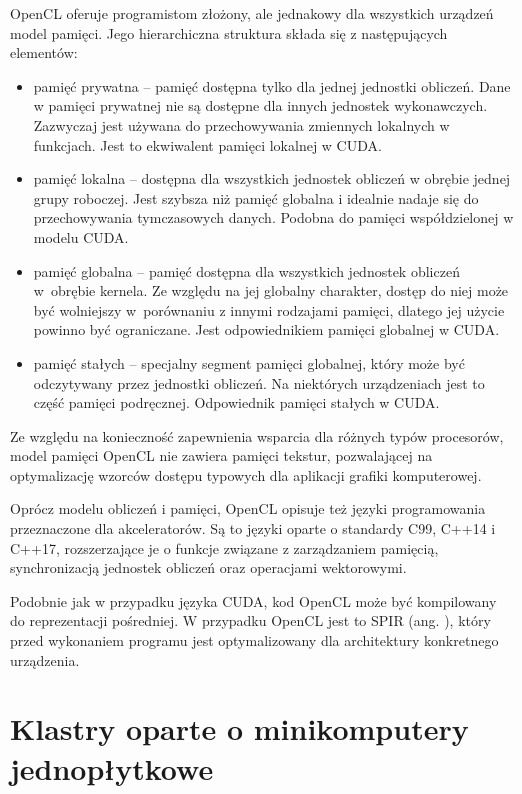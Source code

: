 OpenCL oferuje programistom złożony, ale jednakowy dla wszystkich urządzeń model pamięci. Jego hierarchiczna
struktura składa się z następujących elementów:
\begin{itemize}
      \item pamięć prywatna -- pamięć dostępna tylko dla jednej jednostki obliczeń. Dane w pamięci prywatnej nie
            są dostępne dla innych jednostek wykonawczych. Zazwyczaj jest używana do przechowywania zmiennych
            lokalnych w funkcjach. Jest to ekwiwalent pamięci lokalnej w CUDA.
      \item pamięć lokalna -- dostępna dla wszystkich jednostek obliczeń w obrębie jednej grupy roboczej. Jest szybsza
            niż pamięć globalna i idealnie nadaje się do przechowywania tymczasowych danych. Podobna do pamięci
            współdzielonej w modelu CUDA. \newpage
      \item pamięć globalna -- pamięć dostępna dla wszystkich jednostek obliczeń w~obrębie kernela. Ze względu
            na jej globalny charakter, dostęp do niej może być wolniejszy w~porównaniu z innymi rodzajami pamięci,
            dlatego jej użycie powinno być ograniczane. Jest odpowiednikiem pamięci globalnej w CUDA.
      \item pamięć stałych -- specjalny segment pamięci globalnej, który może być odczytywany przez jednostki
            obliczeń. Na niektórych urządzeniach jest to część pamięci podręcznej. Odpowiednik pamięci stałych w CUDA.
\end{itemize}

Ze względu na konieczność zapewnienia wsparcia dla różnych typów procesorów, model pamięci OpenCL nie
zawiera pamięci tekstur, pozwalającej na optymalizację wzorców dostępu typowych dla aplikacji grafiki komputerowej.

Oprócz modelu obliczeń i pamięci, OpenCL opisuje też języki programowania przeznaczone dla
akceleratorów. Są to języki oparte o standardy C99, C++14 i C++17, rozszerzające je o funkcje
związane z zarządzaniem pamięcią, synchronizacją jednostek obliczeń oraz operacjami wektorowymi.

Podobnie jak w przypadku języka CUDA, kod OpenCL może być kompilowany do reprezentacji pośredniej.
W przypadku OpenCL jest to SPIR (ang. ),
który przed wykonaniem programu jest optymalizowany dla architektury konkretnego urządzenia.

\section{Klastry oparte o minikomputery jednopłytkowe}

